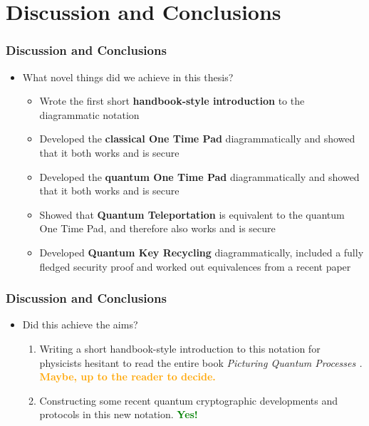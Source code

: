 \documentclass[]{beamer}
\begin{document}
\section{Discussion and Conclusions}
\begin{frame}
	\centering 
	\Huge
\end{frame}
\begin{frame}
	\frametitle{Discussion and Conclusions}
	\begin{itemize}
		\item What novel things did we achieve in this thesis?\pause
		\begin{itemize}
			\item Wrote the first short \textbf{handbook-style introduction} to the diagrammatic notation\pause
			\item Developed the \textbf{classical One Time Pad} diagrammatically and showed that it both works and is secure\pause
			\item Developed the \textbf{quantum One Time Pad} diagrammatically and showed that it both works and is secure\pause
			\item Showed that \textbf{Quantum Teleportation} is equivalent to the quantum One Time Pad, and therefore also works and is secure\pause
			\item Developed \textbf{Quantum Key Recycling} diagrammatically, included a fully fledged security proof and worked out equivalences from a recent paper \cite{Leermakers2019}
		\end{itemize}
	\end{itemize}
\end{frame}

\begin{frame}
	\frametitle{Discussion and Conclusions}
	\begin{itemize}
		\item Did this achieve the aims?\pause
		\begin{enumerate}
			\item Writing a short handbook-style introduction to this notation for physicists hesitant to read the entire book \textit{Picturing Quantum Processes \cite{Coecke2017}.}\pause \newline
			\textcolor{orange}{\textbf{Maybe, up to the reader to decide.}}\pause
			\vspace{0.8cm}
			\item Constructing some recent quantum cryptographic developments and protocols in this new notation.\pause \newline
			\textcolor{green}{\textbf{Yes!}}
		\end{enumerate}
	\end{itemize}
\end{frame}
\end{document}
